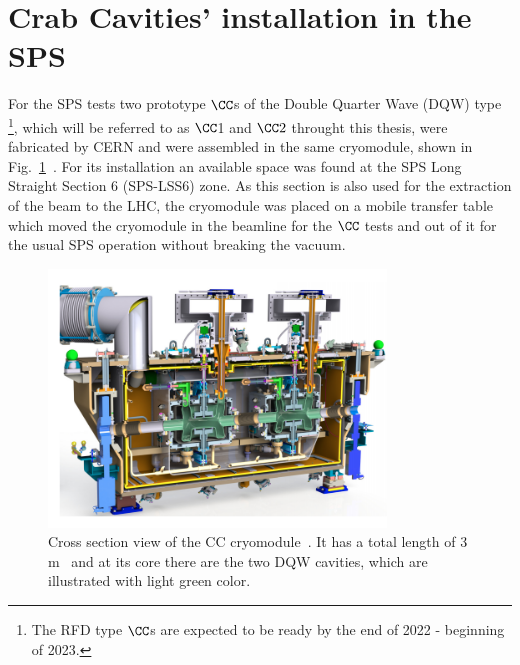 \section{Crab Cavities' installation in the SPS}\label{sec:cc_sps_installation}
For the SPS tests two prototype $\CC$s of the Double Quarter Wave (DQW) type \footnote{The RFD type $\CC$s are expected to be ready by the end of 2022 - beginning of 2023.}, which will be referred to as $\CC$1 and $\CC2$ throught this thesis, were fabricated by CERN and were assembled in the same cryomodule, shown in Fig.~\ref{fig:DQW_cryomodule}~\cite{Zanoni:2017}. For its installation an available space was found at the SPS Long Straight Section 6 (SPS-LSS6) zone. As this section is also used for the extraction of the beam to the LHC, the cryomodule was placed on a mobile transfer table~\cite{Calaga:2649807} which moved the cryomodule in the beamline for the $\CC$ tests and out of it for the usual SPS operation without breaking the vacuum.

\begin{figure}[h]
   \centering         
   \includegraphics[width=0.8\textwidth]{images/Ch4/CC_cryomodule.png}
       \caption{Cross section view of the CC cryomodule~\cite{Zanoni:2017}. It has a total length of 3\,m~\cite{Baudrenghien:1520896} and at its core there are the two DQW cavities, which are illustrated with light green color.}
       \label{fig:DQW_cryomodule}
\end{figure}


